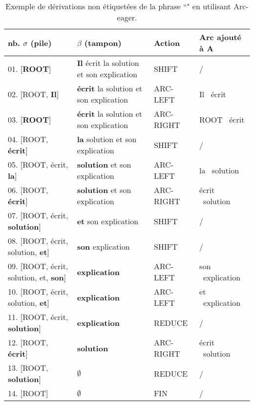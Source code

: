 \documentclass{KodeBook}
\begin{document}
\begin{table}[ht]
		\centering\footnotesize
	\begin{tabular}{llll}
		\hline\hline
		nb. $\sigma$ (pile) & $\beta$ (tampon) & Action & Arc ajouté à A \\
		\hline
		01. [\textbf{ROOT}] & \textbf{Il} écrit la solution et son explication & SHIFT & / \\
		02. [ROOT, \textbf{Il}] & \textbf{écrit} la solution et son explication & ARC-LEFT & Il \textleftarrow\ écrit\\
		03. [\textbf{ROOT}] & \textbf{écrit} la solution et son explication & ARC-RIGHT & ROOT \textrightarrow\ écrit\\	
		04. [ROOT, \textbf{écrit}] & \textbf{la} solution et son explication & SHIFT & / \\	
		05. [ROOT, écrit, \textbf{la}] & \textbf{solution} et son explication & ARC-LEFT & la \textleftarrow\ solution \\
		06. [ROOT, \textbf{écrit}] & \textbf{solution} et son explication & ARC-RIGHT & écrit \textrightarrow\ solution \\
		07. [ROOT, écrit, \textbf{solution}] & \textbf{et} son explication & SHIFT & / \\
		08. [ROOT, écrit, solution, \textbf{et}] & \textbf{son} explication & SHIFT & / \\
		09. [ROOT, écrit, solution, et, \textbf{son}] & \textbf{explication} & ARC-LEFT & son \textleftarrow\ explication \\
		10. [ROOT, écrit, solution, \textbf{et}] & \textbf{explication} & ARC-LEFT & et \textleftarrow\ explication\\	
		11. [ROOT, écrit, \textbf{solution}] & \textbf{explication} & REDUCE & /\\
		12. [ROOT, \textbf{écrit}] & \textbf{solution} & ARC-RIGHT & écrit \textrightarrow\ solution\\
		13. [ROOT, \textbf{solution}] & $\emptyset$ & REDUCE & / \\
		14. [ROOT] & $\emptyset$ & FIN & / \\
		\hline\hline
	\end{tabular}
	\caption[Exemple de dérivations non étiquetées en utilisant Arc-eager.]{Exemple de dérivations non étiquetées de la phrase ``" en utilisant Arc-eager.}
	\label{tab:arc-eager-exp}
\end{table}
\end{document}
